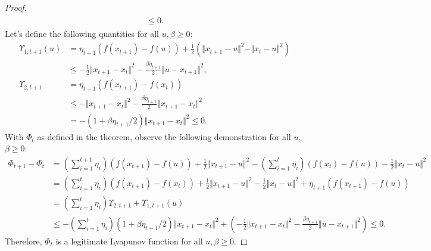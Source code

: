 \documentclass[12pt]{article}
\begin{document}
\begin{proof}
\begin{align*}
\begin{aligned}
                    \le 0. 
                \end{aligned}
            \end{align*}
            Let's define the following quantities for all $u, \beta\ge 0$: 
            \begin{align*}
                \Upsilon_{1, t + 1}(u) &= 
                \eta_{t + 1}(f(x_{t + 1}) - f(u)) + \frac{1}{2}(
                    \Vert x_{t + 1} - u\Vert^2 - 
                    \Vert x_t - u\Vert^2
                )
                \\
                & \le 
                - \frac{1}{2}\Vert x_{t + 1} - x_t\Vert^2
                -\frac{\beta\eta_{t + 1}}{2}\Vert u - x_{t + 1}\Vert^2, 
                \\
                \Upsilon_{2, t + 1}
                &= 
                \eta_{t + 1}(f(x_{t + 1}) - f(x_t))
                \\
                &\le 
                - \Vert x_{t + 1} - x_t\Vert^2 - 
                \frac{\beta\eta_{t + 1}}{2}
                \Vert x_{t + 1} - x_t\Vert^2 
                \\
                &= 
                -(1 + \beta\eta_{t + 1}/2)\Vert x_{t + 1} - x_t\Vert^2 \le 0. 
            \end{align*}
            With $\Phi_t$ as defined in the theorem, observe the following demonstration for all $u$, $\beta \ge 0$: 
            {\small
            \begin{align*}
                \Phi_{t + 1} - \Phi_{t}
                &= 
                \left(
                    \sum_{i = 1}^{t + 1}\eta_i
                \right)(f(x_{t + 1}) - f(u)) + 
                \frac{1}{2}\Vert x_{t + 1} - u\Vert^2 
                - 
                \left(
                    \sum_{i = 1}^{t}\eta_i
                \right)(f(x_{t}) - f(u))
                - 
                \frac{1}{2}\Vert x_{t} - u\Vert^2
                \\
                &= 
                \left(\sum_{i = 1}^{t}\eta_{i}\right)
                (f(x_{t + 1}) - f(x_t)) 
                + \frac{1}{2}\Vert x_{t + 1} - u\Vert^2 
                - \frac{1}{2}\Vert x_{t} - u\Vert^2
                +
                \eta_{t + 1}(f(x_{t + 1}) - f(u))
                \\
                &= 
                \left(\sum_{i = 1}^{t}\eta_{i}\right)\Upsilon_{2, t + 1}
                + \Upsilon_{1, t + 1}(u)
                \\
                &\le 
                -\left(\sum_{i = 1}^{t}\eta_{i}\right)
                (1 + \beta\eta_{t + 1}/2)\Vert x_{t + 1} - x_t\Vert^2
                + 
                \left(
                    - \frac{1}{2}\Vert x_{t + 1} - x_t\Vert^2
                    -\frac{\beta\eta_{t + 1}}{2}\Vert u - x_{t + 1}\Vert^2
                \right)
                \le 0. 
            \end{align*}
            }
            Therefore, $\Phi_t$ is a legitimate Lyapunov function for all $u, \beta \ge 0$. 
        \end{proof}
\end{document}
